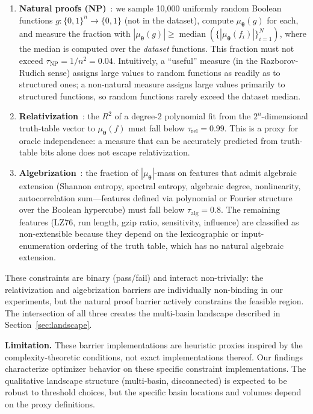 \documentclass[twoside,11pt]{article}
\newcommand{\btheta}{\boldsymbol{\theta}}
\begin{document}
\begin{enumerate}
\item \textbf{Natural proofs (NP)}~\citep{razborov1997natural}: we sample 10{,}000
  uniformly random Boolean functions $g : \{0,1\}^n \to \{0,1\}$ (not in the
  dataset), compute $\mu_\btheta(g)$ for each, and measure the fraction with
  $|\mu_\btheta(g)| \geq \operatorname{median}(\{|\mu_\btheta(f_i)|\}_{i=1}^N)$,
  where the median is computed over the \emph{dataset} functions. This fraction
  must not exceed $\tau_{\text{NP}} = 1/n^2 = 0.04$.
  Intuitively, a ``useful'' measure (in the Razborov-Rudich sense) assigns large
  values to random functions as readily as to structured ones; a non-natural measure
  assigns large values primarily to structured functions, so random functions
  rarely exceed the dataset median.

\item \textbf{Relativization}~\citep{baker1975relativizations}: the $R^2$ of a
  degree-2 polynomial fit from the $2^n$-dimensional truth-table vector to
  $\mu_\btheta(f)$ must fall below $\tau_{\text{rel}} = 0.99$. This is a proxy for
  oracle independence: a measure that can be accurately predicted from truth-table
  bits alone does not escape relativization.

\item \textbf{Algebrization}~\citep{aaronson2008algebrization}: the fraction of
  $|\mu_\btheta|$-mass on features that admit algebraic extension
  (Shannon entropy, spectral entropy, algebraic degree, nonlinearity,
  autocorrelation sum---features defined via polynomial or Fourier structure
  over the Boolean hypercube) must fall below $\tau_{\text{alg}} = 0.8$.
  The remaining features (LZ76, run length, gzip ratio, sensitivity,
  influence) are classified as non-extensible because they depend on the
  lexicographic or input-enumeration ordering of the truth table, which has
  no natural algebraic extension.
\end{enumerate}

These constraints are binary (pass/fail) and interact non-trivially: the
relativization and algebrization barriers are individually non-binding in our
experiments, but the natural proof barrier actively constrains the feasible
region. The intersection of all three creates the multi-basin landscape
described in Section~\ref{sec:landscape}.

\textbf{Limitation.} These barrier implementations are heuristic proxies inspired
by the complexity-theoretic conditions, not exact implementations thereof.
Our findings characterize optimizer behavior on these specific constraint
implementations. The qualitative landscape structure (multi-basin, disconnected)
is expected to be robust to threshold choices, but the specific basin locations
and volumes depend on the proxy definitions.
\end{document}
